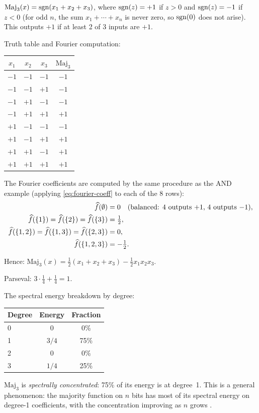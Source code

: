 \begin{example}\label{ex:majority}
$\text{Maj}_3(x) = \operatorname{sgn}(x_1 + x_2 + x_3)$, where $\operatorname{sgn}(z) = +1$ if
$z > 0$ and $\operatorname{sgn}(z) = -1$ if $z < 0$ (for odd $n$, the sum
$x_1 + \cdots + x_n$ is never zero, so $\operatorname{sgn}(0)$ does not arise).
This outputs $+1$ if at least 2 of 3 inputs are $+1$.

Truth table and Fourier computation:
\begin{center}
\begin{tabular}{cccc}
\toprule
$x_1$ & $x_2$ & $x_3$ & $\text{Maj}_3$ \\
\midrule
$-1$ & $-1$ & $-1$ & $-1$ \\
$-1$ & $-1$ & $+1$ & $-1$ \\
$-1$ & $+1$ & $-1$ & $-1$ \\
$-1$ & $+1$ & $+1$ & $+1$ \\
$+1$ & $-1$ & $-1$ & $-1$ \\
$+1$ & $-1$ & $+1$ & $+1$ \\
$+1$ & $+1$ & $-1$ & $+1$ \\
$+1$ & $+1$ & $+1$ & $+1$ \\
\bottomrule
\end{tabular}
\end{center}

The Fourier coefficients are computed by the same procedure as the AND
example (applying \eqref{eq:fourier-coeff} to each of the 8 rows):
\begin{align*}
  \widehat{f}(\emptyset) &= 0 \quad \text{(balanced: 4 outputs $+1$, 4 outputs $-1$)}, \\
  \widehat{f}(\{1\}) = \widehat{f}(\{2\}) = \widehat{f}(\{3\}) &= \tfrac{1}{2}, \\
  \widehat{f}(\{1,2\}) = \widehat{f}(\{1,3\}) = \widehat{f}(\{2,3\}) &= 0, \\
  \widehat{f}(\{1,2,3\}) &= -\tfrac{1}{2}.
\end{align*}

Hence: $\text{Maj}_3(x) = \frac{1}{2}(x_1 + x_2 + x_3) - \frac{1}{2}x_1 x_2 x_3$.

Parseval: $3 \cdot \frac{1}{4} + \frac{1}{4} = 1$. \checkmark

The spectral energy breakdown by degree:
\begin{center}
\begin{tabular}{lcc}
\toprule
Degree & Energy & Fraction \\
\midrule
0 & 0 & 0\% \\
1 & $3/4$ & 75\% \\
2 & 0 & 0\% \\
3 & $1/4$ & 25\% \\
\bottomrule
\end{tabular}
\end{center}

$\text{Maj}_3$ is \emph{spectrally concentrated}: 75\% of its energy is
at degree~1. This is a general phenomenon: the majority function on $n$
bits has most of its spectral energy on degree-1 coefficients, with the
concentration improving as $n$ grows
\citep[Chapter~5]{odonnell2014analysis}.
\end{example}



